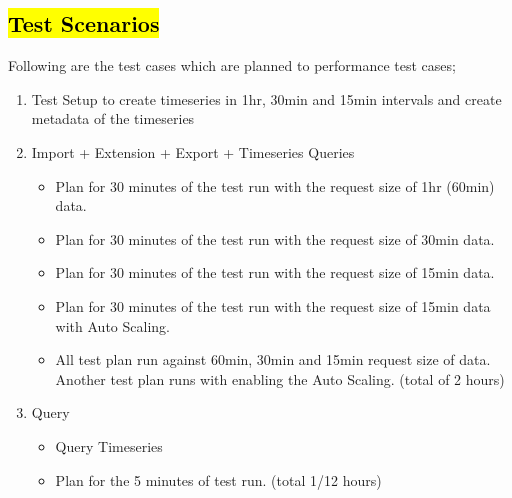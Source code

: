 \subsection{\hl{Test Scenarios}}
\label{subse:test_plan_flow}
Following are the test cases which are planned to performance test cases;
\begin{enumerate}
    \item Test Setup to create timeseries in 1hr, 30min and 15min intervals and create metadata of the timeseries
    \item Import + Extension + Export + Timeseries Queries
    \begin{itemize}
        \item Plan for 30 minutes of the test run with the request size of 1hr (60min) data.
        \item Plan for 30 minutes of the test run with the request size of 30min data.
        \item Plan for 30 minutes of the test run with the request size of 15min data.
        \item Plan for 30 minutes of the test run with the request size of 15min data with Auto Scaling.
        \item All test plan run against 60min, 30min and 15min request size of data. Another test plan runs with enabling the Auto Scaling. (total of 2 hours)
    \end{itemize}
    \item Query
    \begin{itemize}
        \item Query Timeseries
        \item Plan for the 5 minutes of test run. (total 1/12 hours)
    \end{itemize}
\end{enumerate}


